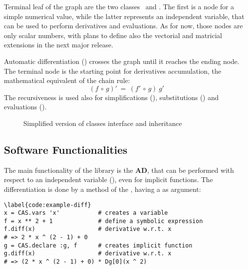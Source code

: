 Terminal leaf of the graph are the two classes \CASConstant~and \CASVariable. The first is a node for a simple numerical value, while the latter represents an independent variable, that can be used to perform derivatives and evaluations. As for now, those nodes are only scalar numbers, with plans to define also the vectorial and matricial extensions in the next major release.

Automatic differentiation (\CASOpdiff) crosses the graph until it reaches the ending node. The terminal node is the starting point for derivatives accumulation, the mathematical equivalent of the chain rule:
\begin{equation}
\left( f  \, \circ \, g \right)' \: = \:
\left( f' \, \circ \, g \right) \: g'
\end{equation}
The recursiveness is used also for simplifications (\CASOpsimplify), substitutions (\CASOpsubs) and evaluations (\CASOpcall).

\begin{figure}[ht!]
\label{fig:uml-container}
\centering

\caption{Simplified version of classes interface and inheritance}
\end{figure}

\subsection{Software Functionalities}
\label{sec:functionalities}


The main functionality of the library is the \textbf{AD}, that can be performed with respect to an independent variable (\CASVariable), even for implicit functions. The differentiation is done by a method of the \CASOp, having a \CASVariable as argument:
\begin{lstlisting}
\label{code:example-diff}
x = CAS.vars 'x'           # creates a variable
f = x ** 2 + 1             # define a symbolic expression
f.diff(x)                  # derivative w.r.t. x
# => 2 * x ^ (2 - 1) + 0
g = CAS.declare :g, f      # creates implicit function
g.diff(x)                  # derivative w.r.t. x
# => (2 * x ^ (2 - 1) + 0) * Dg[0](x ^ 2)
\end{lstlisting}

